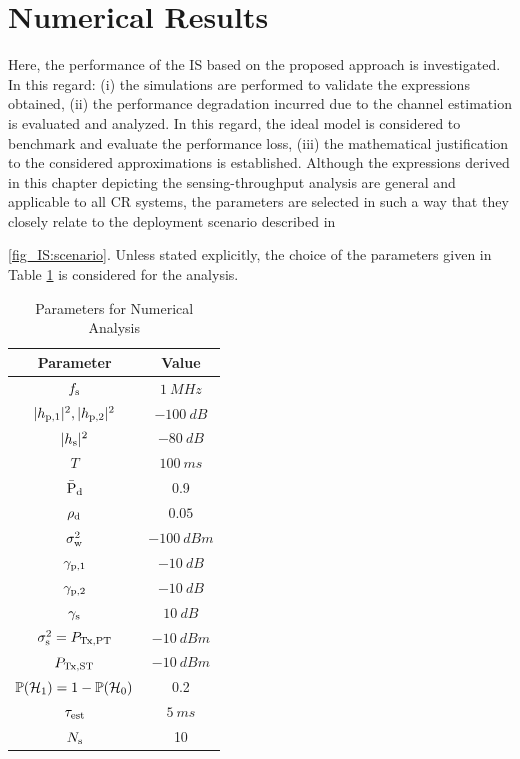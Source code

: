 \section{Numerical Results} \label{sec:num_ana}
Here, the performance of the IS based on the proposed approach is investigated. In this regard: (i) the simulations are performed to validate the expressions obtained, (ii) the performance degradation incurred due to the channel estimation is evaluated and analyzed. In this regard, the ideal model is considered to benchmark and evaluate the performance loss, (iii) the mathematical justification to the considered approximations is established. Although the expressions derived in this chapter depicting the sensing-throughput analysis are general and applicable to all CR systems, the parameters are selected in such a way that they closely relate to the deployment scenario described in \figurename~{\ref{fig_IS:scenario}. Unless stated explicitly, the choice of the parameters given in Table \ref{tb_IS:tb2} is considered for the analysis. 
\begin{table}
\renewcommand{\arraystretch}{1.4}
\caption{Parameters for Numerical Analysis}
\label{tb_IS:tb2}
\centering
\begin{tabular}{c||c}
\hline
\bfseries Parameter & \bfseries Value \\
\hline\hline
$f_{\text{s}}$  & $\SI{1}{MHz}$ \\ %
$|h_{\text{p,1}}|^2, |h_{\text{p,2}}|^2$ & $\SI{-100}{dB}$ \\ %
$|h_{\text{s}}|^2$ & $\SI{-80}{dB}$ \\ %
$T$ & $\SI{100}{ms}$ \\ %
$\bar{\text{P}}_{\text{d}}$ & 0.9 \\ %
$\rho_{\text{d}}$ & $0.05$ \\ %
$\sigma^2_{\text{w}}$ & $\SI{-100}{dBm}$ \\ %
${\gamma}_{\text{p,1}}$ & $\SI{-10}{dB}$ \\ %
${\gamma}_{\text{p,2}}$ & $\SI{-10}{dB}$ \\ %
${\gamma}_{\text{s}}$ & $\SI{10}{dB}$ \\ %
$\sigma^2_{\text{s}} = P_{\text{Tx,PT}}$ & $-\SI{10}{dBm}$ \\ %
$P_{\text{Tx,ST}}$ & $-\SI{10}{dBm}$ \\ %
$\mathbb P(\mathcal{H}_1) = 1 - \mathbb P(\mathcal{H}_0)$ & 0.2 \\ %
$\tau_{\text{est}}$ & $\SI{5}{ms}$ \\ %
$N_{\text{s}}$ & 10 \\ \hline 
\end{tabular}
\end{table}
}
